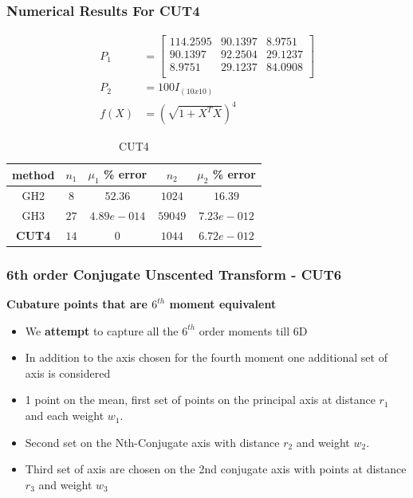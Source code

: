 \documentclass{beamer}
\begin{document}
\begin{frame}
\frametitle{Numerical Results For CUT4}
\begin{align}
 P_1 &= \begin{bmatrix}
       114.2595 & 90.1397 & 8.9751    \\
       90.1397 & 92.2504 & 29.1237    \\
       8.9751 & 29.1237 & 84.0908  \\
       \end{bmatrix}\\
P_2&=100I_{(10x10)}\\
f(X)&=(\sqrt{1+X^TX})^4
\end{align}  
\begin{table}
\normalsize
\caption{CUT4}
\begin{center}
\begin{tabular}{|c||c|c||c|c|}
\hline
method     & 		$n_1$ 	 	 	&				$\mu_1$ \% error 		& 		$n_2$     & 	$\mu_2$ \% error						\\
\hline
GH2  	 &  	 	$8$ 			 	&	  		$	52.36$ 				 	      &   $1024$          &     $16.39$									 \\
\hline 
GH3   	 &  	 	$27$ 			 	&	  		$4.89e-014$ 				 	  &     $59049$        &     $7.23e-012$									 \\
\hline
{\bf CUT4 	}			 &	  	$14$  				&  		$0$ 				              &       $1044$      & 		$6.72e-012$								\\
\hline
\end{tabular}
\end{center}
\end{table}
\end{frame}
\begin{frame}
\frametitle{6th order Conjugate Unscented Transform - CUT6 }
{\bf Cubature points that are $6^{th}$ moment equivalent}\newline
\begin{itemize}[<+->]
\item We {\bf attempt} to capture all the $6^{th}$ order moments till 6D
\item In addition to the axis chosen for the fourth moment one additional set of axis is considered
\item 1 point on the mean, first set of points on the principal axis at distance $r_1$ and each weight $w_1$.
\item Second set on the Nth-Conjugate axis with distance $r_2$ and weight $w_2$.
\item Third set of axis are chosen on the 2nd conjugate axis with points at distance $r_3$ and weight $w_3$
\end{itemize}
\end{frame}
\end{document}
